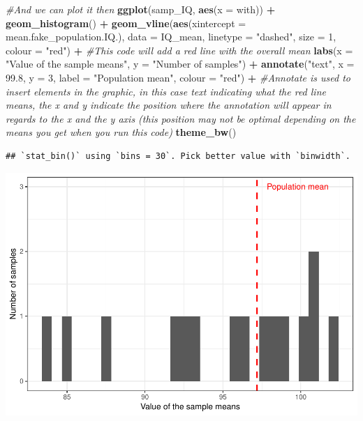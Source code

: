 \documentclass[]{book}
\newenvironment{Shaded}{\begin{snugshade}}{\end{snugshade}}
\newcommand{\CommentTok}[1]{\textcolor[rgb]{0.56,0.35,0.01}{\textit{#1}}}
\newcommand{\DataTypeTok}[1]{\textcolor[rgb]{0.13,0.29,0.53}{#1}}
\newcommand{\DecValTok}[1]{\textcolor[rgb]{0.00,0.00,0.81}{#1}}
\newcommand{\FloatTok}[1]{\textcolor[rgb]{0.00,0.00,0.81}{#1}}
\newcommand{\KeywordTok}[1]{\textcolor[rgb]{0.13,0.29,0.53}{\textbf{#1}}}
\newcommand{\NormalTok}[1]{#1}
\newcommand{\OperatorTok}[1]{\textcolor[rgb]{0.81,0.36,0.00}{\textbf{#1}}}
\newcommand{\StringTok}[1]{\textcolor[rgb]{0.31,0.60,0.02}{#1}}
\theoremstyle{definition}
\theoremstyle{definition}
\theoremstyle{definition}
\theoremstyle{remark}
\begin{document}
\begin{Shaded}
\begin{Highlighting}[]
\CommentTok{#And we can plot it then}
\KeywordTok{ggplot}\NormalTok{(samp_IQ, }\KeywordTok{aes}\NormalTok{(}\DataTypeTok{x =}\NormalTok{ with)) }\OperatorTok{+}\StringTok{ }
\StringTok{  }\KeywordTok{geom_histogram}\NormalTok{() }\OperatorTok{+}
\StringTok{  }\KeywordTok{geom_vline}\NormalTok{(}\KeywordTok{aes}\NormalTok{(}\DataTypeTok{xintercept =}\NormalTok{ mean.fake_population.IQ.), }\DataTypeTok{data =}\NormalTok{ IQ_mean,}
             \DataTypeTok{linetype =} \StringTok{"dashed"}\NormalTok{, }\DataTypeTok{size =} \DecValTok{1}\NormalTok{, }\DataTypeTok{colour =} \StringTok{"red"}\NormalTok{) }\OperatorTok{+}\StringTok{ }\CommentTok{#This code will add a red line with the overall mean}
\StringTok{  }\KeywordTok{labs}\NormalTok{(}\DataTypeTok{x =} \StringTok{"Value of the sample means"}\NormalTok{, }\DataTypeTok{y =} \StringTok{"Number of samples"}\NormalTok{) }\OperatorTok{+}
\StringTok{  }\KeywordTok{annotate}\NormalTok{(}\StringTok{"text"}\NormalTok{, }\DataTypeTok{x =} \FloatTok{99.8}\NormalTok{, }\DataTypeTok{y =} \DecValTok{3}\NormalTok{, }\DataTypeTok{label =} \StringTok{"Population mean"}\NormalTok{, }\DataTypeTok{colour =} \StringTok{"red"}\NormalTok{) }\OperatorTok{+}\StringTok{ }\CommentTok{#Annotate is used to insert elements in the graphic, in this case text indicating what the red line means, the x and y indicate the position where the annotation will appear in regards to the x and the y axis (this position may not be optimal depending on the means you get when you run this code)}
\StringTok{  }\KeywordTok{theme_bw}\NormalTok{()}
\end{Highlighting}
\end{Shaded}

\begin{verbatim}
## `stat_bin()` using `bins = 30`. Pick better value with `binwidth`.
\end{verbatim}

\includegraphics{05-inference_files/figure-latex/unnamed-chunk-12-1.pdf}
\end{document}
